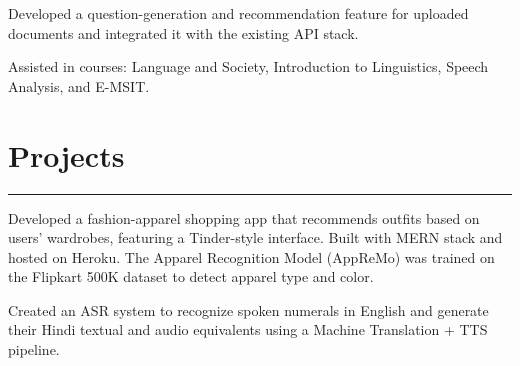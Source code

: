 \documentclass[]{rahulworld-resume}
\begin{document}
\begin{minipage}[t]{0.64\textwidth}
 
\noindent
\hspace{5em}%
\begin{minipage}{0.85\textwidth\vspace{5pt}}
Developed a question-generation and recommendation feature for uploaded documents and integrated it with the existing API stack.
\end{minipage}

 
\noindent
\hspace{5em}%
\begin{minipage}{0.85\textwidth\vspace{5pt}}
Assisted in courses: Language and Society, Introduction to Linguistics, Speech Analysis, and E-MSIT.
\end{minipage}

\section{Projects}
\noindent\rule{12.5cm}{0.4pt}

 
\noindent
\hspace{5em}%
\begin{minipage}{0.85\textwidth\vspace{5pt}}
Developed a fashion-apparel shopping app that recommends outfits based on users' wardrobes, featuring a Tinder-style interface. Built with MERN stack and hosted on Heroku. The Apparel Recognition Model (AppReMo) was trained on the Flipkart 500K dataset to detect apparel type and color.
\end{minipage}

 
\noindent
\hspace{5em}%
\begin{minipage}{0.85\textwidth\vspace{5pt}}
Created an ASR system to recognize spoken numerals in English and generate their Hindi textual and audio equivalents using a Machine Translation + TTS pipeline.
\end{minipage}


\end{minipage}
\end{document}
